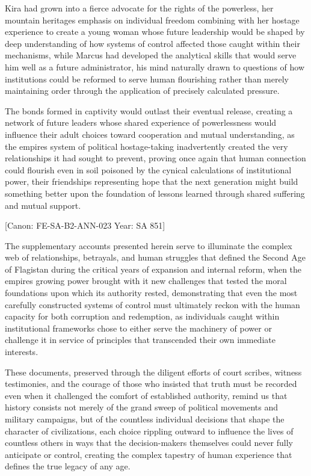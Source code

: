 Kira had grown into a fierce advocate for the rights of the powerless,
her mountain heritage\textquotesingle s emphasis on individual freedom
combining with her hostage experience to create a young woman whose
future leadership would be shaped by deep understanding of how systems
of control affected those caught within their mechanisms, while Marcus
had developed the analytical skills that would serve him well as a
future administrator, his mind naturally drawn to questions of how
institutions could be reformed to serve human flourishing rather than
merely maintaining order through the application of precisely calculated
pressure.

The bonds formed in captivity would outlast their eventual release,
creating a network of future leaders whose shared experience of
powerlessness would influence their adult choices toward cooperation and
mutual understanding, as the empire\textquotesingle s system of
political hostage-taking inadvertently created the very relationships it
had sought to prevent, proving once again that human connection could
flourish even in soil poisoned by the cynical calculations of
institutional power, their friendships representing hope that the next
generation might build something better upon the foundation of lessons
learned through shared suffering and mutual support.

{[}Canon: FE-SA-B2-ANN-023 \textbar{} Year: SA 851{]}

The supplementary accounts presented herein serve to illuminate the
complex web of relationships, betrayals, and human struggles that
defined the Second Age of Flagistan during the critical years of
expansion and internal reform, when the empire\textquotesingle s growing
power brought with it new challenges that tested the moral foundations
upon which its authority rested, demonstrating that even the most
carefully constructed systems of control must ultimately reckon with the
human capacity for both corruption and redemption, as individuals caught
within institutional frameworks chose to either serve the machinery of
power or challenge it in service of principles that transcended their
own immediate interests.

These documents, preserved through the diligent efforts of court
scribes, witness testimonies, and the courage of those who insisted that
truth must be recorded even when it challenged the comfort of
established authority, remind us that history consists not merely of the
grand sweep of political movements and military campaigns, but of the
countless individual decisions that shape the character of
civilizations, each choice rippling outward to influence the lives of
countless others in ways that the decision-makers themselves could never
fully anticipate or control, creating the complex tapestry of human
experience that defines the true legacy of any age.

